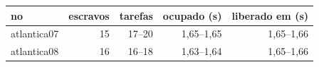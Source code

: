 \begin{tabular}{lrrrr}
\toprule
no & escravos & tarefas & ocupado (s) & liberado em (s) \\
\midrule
atlantica07 & 15 & 17--20 & 1,65--1,65 & 1,65--1,66 \\
atlantica08 & 16 & 16--18 & 1,63--1,64 & 1,65--1,66 \\
\bottomrule
\end{tabular}
